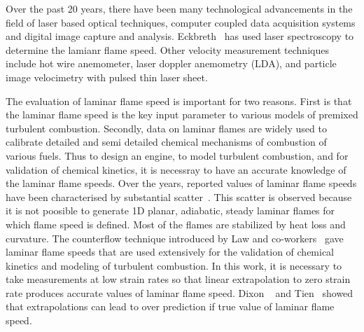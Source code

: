  Over the past 20 years, there have been many technological
advancements in the field of laser based optical techniques, computer
coupled data acquisition systems and digital image capture and
analysis. Eckbreth~\cite{eckbreth} has used laser spectroscopy to
determine the lamianr flame speed. Other velocity measurement
techniques include hot wire anemometer, laser doppler anemometry (LDA),
and particle image velocimetry with pulsed thin laser sheet.


 The evaluation of laminar flame speed is important for 
two reasons. First is that the laminar flame speed is the key
input parameter to various models of premixed turbulent
combustion. Secondly, data on laminar flames are widely used to calibrate
detailed and semi detailed chemical mechanisms of combustion of
various fuels. Thus to design an engine, to model turbulent combustion,
and for validation of chemical kinetics, it is necessray to have an
accurate knowledge of the laminar flame speeds. Over the years,
reported values of laminar flame speeds have been characterised by
substantial scatter~\cite{Andrew}. This scatter is observed because it
is not poosible to generate 1D planar, adiabatic, steady laminar
flames for which flame speed is defined. Most of the flames are
stabilized by heat loss and curvature. The counterflow technique
introduced by Law and co-workers~\cite{law} gave laminar flame speeds
that are used extensively for the validation of chemical kinetics and
modeling of turbulent combustion. In this work, it is necessary to
take measurements at low strain rates so that linear extrapolation to
zero strain rate produces accurate values of laminar flame
speed. Dixon ~\cite{dixon} and Tien~\cite{tien} showed that
extrapolations can lead to over prediction if true value of laminar
flame speed.

